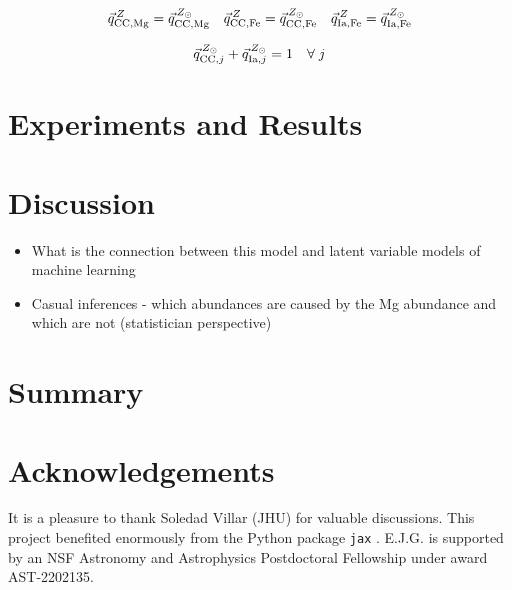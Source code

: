 \documentclass[modern]{aastex631}
\begin{document}
\begin{equation}
    \vec{q}_{{\rm CC, Mg}}^{\,Z} = \vec{q}_{{\rm CC, Mg}}^{\,Z_{\odot}} \quad 
    \vec{q}_{{\rm CC, Fe}}^{\,Z} = \vec{q}_{{\rm CC, Fe}}^{\,Z_{\odot}}  \quad 
    \vec{q}_{{\rm Ia, Fe}}^{\,Z} = \vec{q}_{{\rm Ia, Fe}}^{\,Z_{\odot}} 
\end{equation}

\begin{equation}
    \vec{q}_{{\rm CC}, j}^{\,Z_{\odot}} + \vec{q}_{{\rm Ia}, j}^{\,Z_{\odot}} = 1 \quad \forall \; j
\end{equation}

\section{Experiments and Results}

\section{Discussion}

\begin{itemize}
    \item What is the connection between this model and latent variable models of machine learning
    \item Casual inferences - which abundances are caused by the Mg abundance and which are not (statistician perspective)
    
\end{itemize}

\section{Summary}

\section{Acknowledgements}
It is a pleasure to thank
  Soledad Villar (JHU)
for valuable discussions.
This project benefited enormously from the Python package \texttt{jax} \citep{jax}.
E.J.G. is supported by an NSF Astronomy and Astrophysics Postdoctoral Fellowship under award AST-2202135.


{}

\end{document}
